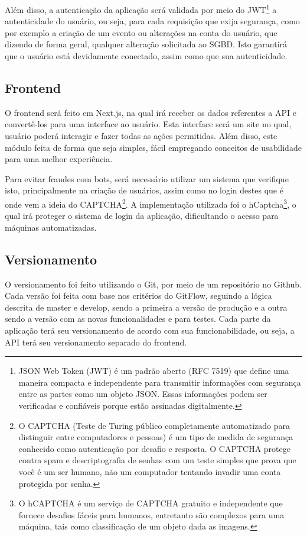 Além disso, a autenticação da aplicação será validada por meio do JWT\footnote{JSON Web Token (JWT) é um padrão aberto (RFC 7519) que define uma maneira compacta e independente para transmitir informações com segurança entre as partes como um objeto JSON. Essas informações podem ser verificadas e confiáveis porque estão assinadas digitalmente.} a autenticidade do usuário, ou seja, para cada requisição que exija segurança, como por exemplo a criação de um evento ou alterações na conta do usuário, que dizendo de forma geral, qualquer alteração solicitada ao SGBD. Isto garantirá que o usuário está devidamente conectado, assim como que sua autenticidade.

\subsection{Frontend}
O frontend será feito em Next.js, na qual irá receber os dados referentes a API e convertê-los para uma interface ao usuário. Esta interface será um site no qual, usuário poderá interagir e fazer todas as ações permitidas. Além disso, este módulo feita de forma que seja simples, fácil empregando conceitos de usabilidade para uma melhor experiência.

Para evitar fraudes com bots, será necessário utilizar um sistema que verifique isto, principalmente na criação de usuários, assim como no login destes que é onde vem a ideia do CAPTCHA\footnote{O CAPTCHA (Teste de Turing público completamente automatizado para distinguir entre computadores e pessoas) é um tipo de medida de segurança conhecido como autenticação por desafio e resposta. O CAPTCHA protege contra spam e descriptografia de senhas com um teste simples que prova que você é um ser humano, não um computador tentando invadir uma conta protegida por senha.}. A implementação utilizada foi o hCaptcha\footnote{O hCAPTCHA é um serviço de CAPTCHA gratuito e independente que fornece desafios fáceis para humanos, entretanto são complexos para uma máquina, tais como classificação de um objeto dada as imagens.}, o qual irá proteger o sistema de login da aplicação, dificultando o acesso para máquinas automatizadas.

\subsection{Versionamento}
O versionamento foi feito utilizando o Git, por meio de um repositório no Github. Cada versão foi feita com base nos critérios do GitFlow, seguindo a lógica descrita de master e develop, sendo a primeira a versão de produção e a outra sendo a versão com as novas funcionalidades e para testes. Cada parte da aplicação terá seu versionamento de acordo com sua funcionabilidade, ou seja, a API terá seu versionamento separado do frontend.